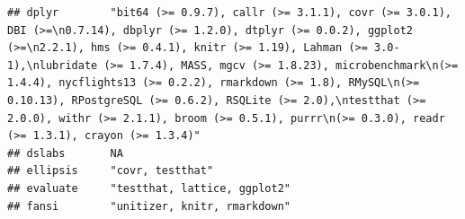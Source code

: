 \documentclass[]{article}
\begin{document}
\begin{verbatim}
## dplyr        "bit64 (>= 0.9.7), callr (>= 3.1.1), covr (>= 3.0.1), DBI (>=\n0.7.14), dbplyr (>= 1.2.0), dtplyr (>= 0.0.2), ggplot2 (>=\n2.2.1), hms (>= 0.4.1), knitr (>= 1.19), Lahman (>= 3.0-1),\nlubridate (>= 1.7.4), MASS, mgcv (>= 1.8.23), microbenchmark\n(>= 1.4.4), nycflights13 (>= 0.2.2), rmarkdown (>= 1.8), RMySQL\n(>= 0.10.13), RPostgreSQL (>= 0.6.2), RSQLite (>= 2.0),\ntestthat (>= 2.0.0), withr (>= 2.1.1), broom (>= 0.5.1), purrr\n(>= 0.3.0), readr (>= 1.3.1), crayon (>= 1.3.4)"                                                                                          
## dslabs       NA                                                                                                                                                                                                                                                                                                                                                                                                                                                                                                                                                                                        
## ellipsis     "covr, testthat"                                                                                                                                                                                                                                                                                                                                                                                                                                                                                                                                                                          
## evaluate     "testthat, lattice, ggplot2"                                                                                                                                                                                                                                                                                                                                                                                                                                                                                                                                                              
## fansi        "unitizer, knitr, rmarkdown"                                                                                                                                                                                                                                                                                                                                                                                                                                                                                                                                                              

\end{verbatim}
\end{document}
